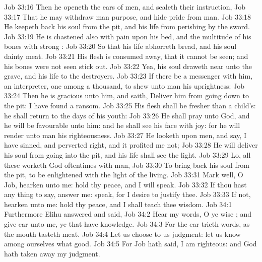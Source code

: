 \vs Job 33:16 Then he openeth the ears of men, and sealeth their instruction,
\vs Job 33:17 That he may withdraw man  purpose, and hide pride from man.
\vs Job 33:18 He keepeth back his soul from the pit, and his life from perishing by the sword.
\vs Job 33:19 He is chastened also with pain upon his bed, and the multitude of his bones with strong :
\vs Job 33:20 So that his life abhorreth bread, and his soul dainty meat.
\vs Job 33:21 His flesh is consumed away, that it cannot be seen; and his bones  were not seen stick out.
\vs Job 33:22 Yea, his soul draweth near unto the grave, and his life to the destroyers.
\vs Job 33:23 If there be a messenger with him, an interpreter, one among a thousand, to shew unto man his uprightness:
\vs Job 33:24 Then he is gracious unto him, and saith, Deliver him from going down to the pit: I have found a ransom.
\vs Job 33:25 His flesh shall be fresher than a child's: he shall return to the days of his youth:
\vs Job 33:26 He shall pray unto God, and he will be favourable unto him: and he shall see his face with joy: for he will render unto man his righteousness.
\vs Job 33:27 He looketh upon men, and  say, I have sinned, and perverted  right, and it profited me not;
\vs Job 33:28 He will deliver his soul from going into the pit, and his life shall see the light.
\vs Job 33:29 Lo, all these  worketh God oftentimes with man,
\vs Job 33:30 To bring back his soul from the pit, to be enlightened with the light of the living.
\vs Job 33:31 Mark well, O Job, hearken unto me: hold thy peace, and I will speak.
\vs Job 33:32 If thou hast any thing to say, answer me: speak, for I desire to justify thee.
\vs Job 33:33 If not, hearken unto me: hold thy peace, and I shall teach thee wisdom.
\vs Job 34:1 Furthermore Elihu answered and said,
\vs Job 34:2 Hear my words, O ye wise ; and give ear unto me, ye that have knowledge.
\vs Job 34:3 For the ear trieth words, as the mouth tasteth meat.
\vs Job 34:4 Let us choose to us judgment: let us know among ourselves what  good.
\vs Job 34:5 For Job hath said, I am righteous: and God hath taken away my judgment.
